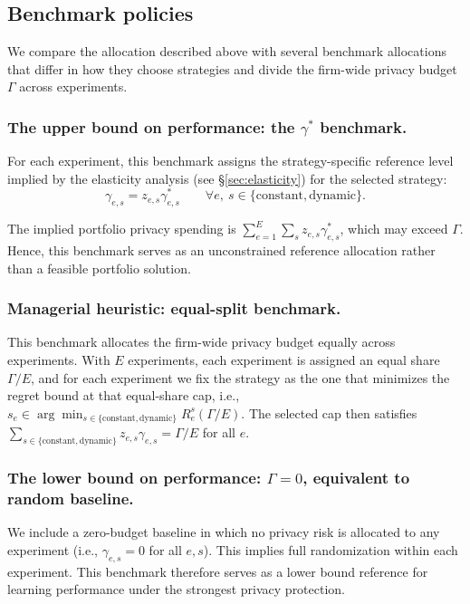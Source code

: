 \documentclass[mksc,nonblindrev]{informs3}
\begin{document}
\subsection{Benchmark policies}\label{sec:benchmarks}
We compare the allocation described above with several benchmark allocations that differ in how they choose strategies and divide the firm-wide privacy budget $\Gamma$ across experiments.

\subsubsection{The upper bound on performance: the $\gamma^*$ benchmark.}
For each experiment, this benchmark assigns the strategy-specific reference level implied by the elasticity analysis (see \S\ref{sec:elasticity}) for the selected strategy:
\[
\gamma_{e,s}=z_{e,s}\gamma^*_{e,s}
\qquad\forall e,\ s\in\{\mathrm{constant},\mathrm{dynamic}\}.
\]

The implied portfolio privacy spending is $\sum_{e=1}^E \sum_s z_{e,s}\gamma^*_{e,s}$, which may exceed $\Gamma$. Hence, this benchmark serves as an unconstrained reference allocation rather than a feasible portfolio solution.

\subsubsection{Managerial heuristic: equal-split benchmark.}
This benchmark allocates the firm-wide privacy budget equally across experiments. With $E$ experiments, each experiment is assigned an equal share $\Gamma/E$, and for each experiment we fix the strategy as the one that minimizes the regret bound at that equal-share cap, i.e., $s_e \in \arg\min_{s\in\{\mathrm{constant},\mathrm{dynamic}\}} R_e^{s}(\Gamma/E).$ The selected cap then satisfies $\sum_{s\in\{\mathrm{constant},\mathrm{dynamic}\}} z_{e,s}\gamma_{e,s}=\Gamma/E$ for all $e$.

\subsubsection{The lower bound on performance: $\Gamma=0$, equivalent to random baseline.}
We include a zero-budget baseline in which no privacy risk is allocated to any experiment (i.e., $\gamma_{e,s}=0$ for all $e,s$). This implies full randomization within each experiment. This benchmark therefore serves as a lower bound reference for learning performance under the strongest privacy protection.
\end{document}
